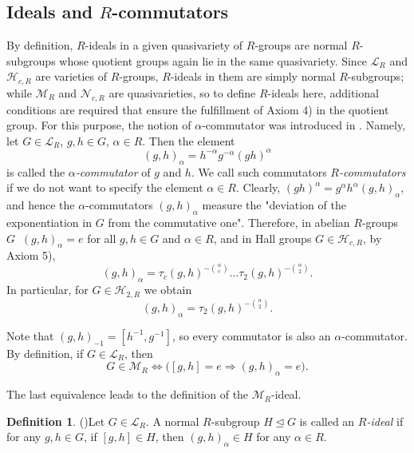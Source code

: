 \documentclass[11pt]{article}
\def\N{{\mathbb N}}
\def\M{{\mathcal{M}}}
\def\N{{\mathcal{N}}}
\theoremstyle{definition}
\newtheorem{definition}{Definition}[section]
\begin{document}
\subsection{Ideals and \texorpdfstring{$R$}{}-commutators}
\label{se:2.2}

By definition, $R$-ideals in a given quasivariety of $R$-groups are normal $R$-subgroups whose quotient groups again lie in the same quasivariety. Since $\mathcal{L}_{R}$ and $\mathcal{H}_{c,R}$ are varieties of $R$-groups, $R$-ideals in them are simply normal $R$-subgroups; while $\M_R$ and $\N_{c,R}$ are quasivarieties, so to define $R$-ideals here, additional conditions are required that ensure the fulfillment of Axiom 4) in the quotient group. For this purpose, the notion of $\alpha$-commutator was introduced in \cite{2}.
Namely,
let $G\in\mathcal{L}_R$, $g,h\in G$, $\alpha\in R$. Then the element
\begin{equation} \label{def:1.4}
      (g,h)_{\alpha}=h^{-\alpha}g^{-\alpha}(gh)^{\alpha}   
\end{equation}
is called the \emph{$\alpha$-commutator} of $g$ and $h$. We call such commutators \emph{$R$-commutators} if we do not want to specify the element $\alpha \in R$. Clearly, $(gh)^{\alpha} =g^{\alpha}h^{\alpha}(g,h)_{\alpha}$, and hence the $\alpha$-commutators $(g,h)_\alpha$ measure the "deviation
of the exponentiation in $G$ from the commutative one". Therefore, in abelian $R$-groups $G \ $ $(g,h)_\alpha = e$ for all $g,h \in G$ and $\alpha \in R$, and in Hall groups $G \in \mathcal{H}_{c,R}$, by Axiom 5),
$$
(g,h)_\alpha = \tau_c(g,h)^{-\binom{\alpha}{c}} \ldots \tau_2(g,h)^{-\binom{\alpha}{2}}.
$$
In particular, for $G \in \mathcal{H}_{2,R}$ we obtain
\begin{equation} \label{eq:Hall-commutator}
    (g,h)_\alpha = \tau_2(g,h)^{-\binom{\alpha}{2}}.
\end{equation}

Note that $(g,h)_{-1} =[h^{-1},g^{-1}]$, so every commutator is also an $\alpha$-commutator. By definition, if $G\in\mathcal{L}_R$, then
$$
 G\in\mathcal{M}_R \Longleftrightarrow \big([g,h]=e\Longrightarrow (g,h)_{\alpha}=e\big).
$$

The last equivalence leads to the definition of the $\mathcal{M}_R$-ideal.

\begin{definition}(\cite{2})\label{def:1.5}
Let $G\in\mathcal{L}_R$. A normal $R$-subgroup $H\trianglelefteq G$ is called an \emph{$R$-ideal} if for any $g,h\in G$, if  $[g,h]\in H$, then $(g,h)_{\alpha}\in H$ for any $\alpha\in R$.
\end{definition}
\end{document}
